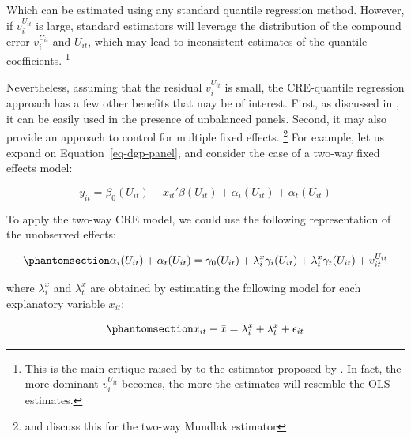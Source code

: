 \documentclass[bib]{statapress}
\begin{document}
Which can be estimated using any standard quantile regression method.
However, if \(v^{U_{it}}_i\) is large, standard estimators will leverage
the distribution of the compound error \(v^{U_{it}}_i\) and \(U_{it}\),
which may lead to inconsistent estimates of the quantile coefficients.
\footnote{This is the main critique raised by \citet{canay2011} to the
  estimator proposed by \citet{abrevaya2008}. In fact, the more dominant
  \(v^{U_{it}}_i\) becomes, the more the estimates will resemble the OLS
  estimates.}

Nevertheless, assuming that the residual \(v^{U_{it}}_i\) is small, the
CRE-quantile regression approach has a few other benefits that may be of
interest. First, as discussed in \citet{wooldridge2019}, it can be
easily used in the presence of unbalanced panels. Second, it may also
provide an approach to control for multiple fixed effects. \footnote{\citet{baltagi2023}
  and \citet{wooldridge2021} discuss this for the two-way Mundlak
  estimator} For example, let us expand on Equation~\ref{eq-dgp-panel},
and consider the case of a two-way fixed effects model:

\[y_{it} = \beta_0(U_{it}) + x_{it}'\beta(U_{it}) + \alpha_i(U_{it}) + \alpha_t(U_{it})
\]

To apply the two-way CRE model, we could use the following
representation of the unobserved effects:

\begin{equation}\phantomsection\label{eq-cre-unobs}{\alpha_i(U_{it}) + \alpha_t(U_{it}) = \gamma_0(U_{it}) + \lambda_i^x \gamma_i(U_{it}) + \lambda_t^x \gamma_t(U_{it}) + v^{U_{it}}_{it}
}\end{equation}

where \(\lambda_i^x\) and \(\lambda_t^x\) are obtained by estimating the
following model for each explanatory variable \(x_{it}\):

\begin{equation}\phantomsection\label{eq-cre-2way}{x_{it} -\bar x = \lambda_i^x + \lambda_t^x + \epsilon_{it}
}\end{equation}
\end{document}
